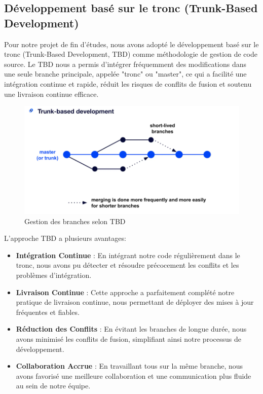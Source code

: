 \subsection{Développement basé sur le tronc (Trunk-Based Development)}

\hspace{\parindent} Pour notre projet de fin d’études, nous avons adopté le développement basé sur le tronc (Trunk-Based Development, TBD) comme méthodologie de gestion de code source. Le TBD nous a permis d'intégrer fréquemment des modifications dans une seule branche principale, appelée "tronc" ou "master", ce qui a facilité une intégration continue et rapide, réduit les risques de conflits de fusion et soutenu une livraison continue efficace.

\begin{figure}[H]
    \centering
    \includegraphics[width=15cm]{Figures/tbd.png}
    \caption{Gestion des branches selon TBD}
\end{figure}

L'approche TBD a plusieurs avantages:
\begin{itemize}

    \item \textbf{Intégration Continue} : En intégrant notre code régulièrement dans le tronc, nous avons pu détecter et résoudre précocement les conflits et les problèmes d'intégration.

    \item \textbf{Livraison Continue} : Cette approche a parfaitement complété notre pratique de livraison continue, nous permettant de déployer des mises à jour fréquentes et fiables.

    \item \textbf{Réduction des Conflits} : En évitant les branches de longue durée, nous avons minimisé les conflits de fusion, simplifiant ainsi notre processus de développement.

    \item \textbf{Collaboration Accrue} : En travaillant tous sur la même branche, nous avons favorisé une meilleure collaboration et une communication plus fluide au sein de notre équipe.

\end{itemize}





